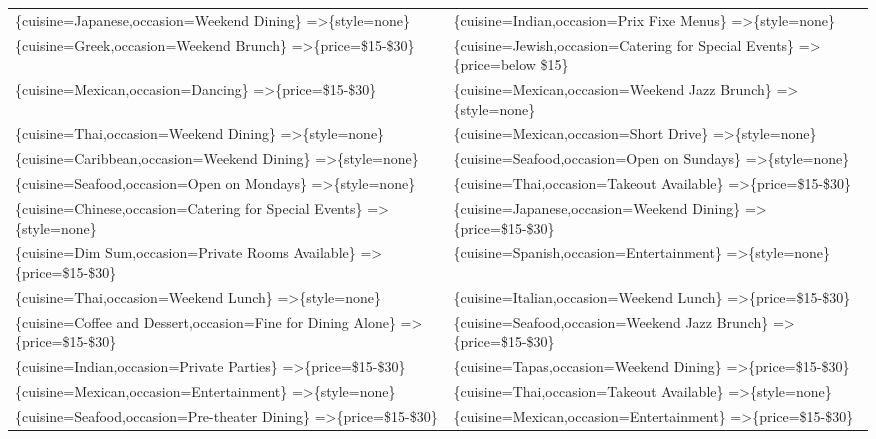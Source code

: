 \documentclass[letterpaper,10pt]{article}
\begin{document}
\begin{appendices}
\begin{table}[h]
\begin{adjustbox}{max width=\textwidth}
\begin{tabular}{ll}
\{cuisine=Japanese,occasion=Weekend Dining\} =\textgreater \{style=none\} & \{cuisine=Indian,occasion=Prix Fixe Menus\} =\textgreater \{style=none\} \\ 
\{cuisine=Greek,occasion=Weekend Brunch\} =\textgreater \{price=\$15-\$30\} & \{cuisine=Jewish,occasion=Catering for Special Events\} =\textgreater \{price=below \$15\} \\ 
\{cuisine=Mexican,occasion=Dancing\} =\textgreater \{price=\$15-\$30\} & \{cuisine=Mexican,occasion=Weekend Jazz Brunch\} =\textgreater \{style=none\} \\ 
\{cuisine=Thai,occasion=Weekend Dining\} =\textgreater \{style=none\} & \{cuisine=Mexican,occasion=Short Drive\} =\textgreater \{style=none\} \\ 
\{cuisine=Caribbean,occasion=Weekend Dining\} =\textgreater \{style=none\} & \{cuisine=Seafood,occasion=Open on Sundays\} =\textgreater \{style=none\} \\ 
\{cuisine=Seafood,occasion=Open on Mondays\} =\textgreater \{style=none\} & \{cuisine=Thai,occasion=Takeout Available\} =\textgreater \{price=\$15-\$30\} \\ 
\{cuisine=Chinese,occasion=Catering for Special Events\} =\textgreater \{style=none\} & \{cuisine=Japanese,occasion=Weekend Dining\} =\textgreater \{price=\$15-\$30\} \\ 
\{cuisine=Dim Sum,occasion=Private Rooms Available\} =\textgreater \{price=\$15-\$30\} & \{cuisine=Spanish,occasion=Entertainment\} =\textgreater \{style=none\} \\ 
\{cuisine=Thai,occasion=Weekend Lunch\} =\textgreater \{style=none\} & \{cuisine=Italian,occasion=Weekend Lunch\} =\textgreater \{price=\$15-\$30\} \\ 
\{cuisine=Coffee and Dessert,occasion=Fine for Dining Alone\} =\textgreater \{price=\$15-\$30\} & \{cuisine=Seafood,occasion=Weekend Jazz Brunch\} =\textgreater \{price=\$15-\$30\} \\ 
\{cuisine=Indian,occasion=Private Parties\} =\textgreater \{price=\$15-\$30\} & \{cuisine=Tapas,occasion=Weekend Dining\} =\textgreater \{price=\$15-\$30\} \\ 
\{cuisine=Mexican,occasion=Entertainment\} =\textgreater \{style=none\} & \{cuisine=Thai,occasion=Takeout Available\} =\textgreater \{style=none\} \\ 
\{cuisine=Seafood,occasion=Pre-theater Dining\} =\textgreater \{price=\$15-\$30\} & \{cuisine=Mexican,occasion=Entertainment\} =\textgreater \{price=\$15-\$30\} \\ 

\end{tabular}
\end{adjustbox}
\end{table}
\end{appendices}
\end{document}
